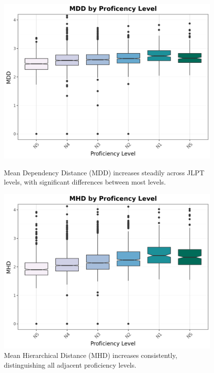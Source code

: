 \begin{figure}[htbp]
    \centering
    \begin{minipage}{.48\textwidth}
        \centering
    \includegraphics[scale=.4]{img/MDD}
    \caption[Mean Dependency Distance across JLPT Proficiency Levels]{Mean Dependency Distance (MDD) increases steadily across JLPT levels, with significant differences between most levels.}
        \label{fig:mdd}
    \end{minipage}
    \hfill
\begin{minipage}{.48\textwidth}
        \centering
        \includegraphics[scale=.4]{img/MHD}
        \caption[Mean Hierarchical Distance across JLPT Proficiency Levels]{Mean Hierarchical Distance (MHD) increases consistently, distinguishing all adjacent proficiency levels.}
\label{fig:mhd}
\end{minipage}
    \end{figure}


